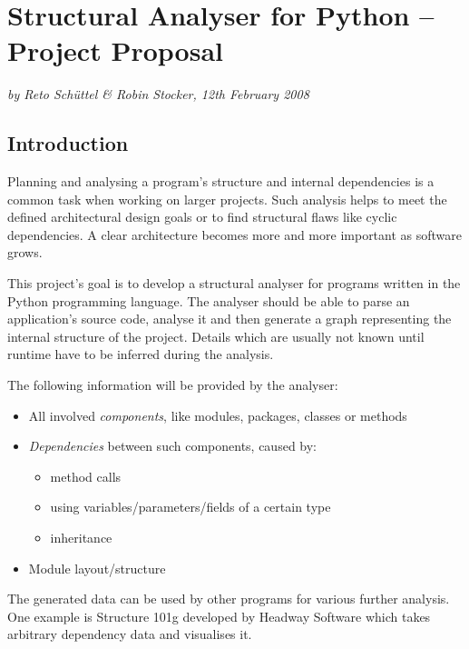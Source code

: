 \documentclass[12pt,halfparskip]{scrartcl}
\begin{document}
\pagestyle{plain}

\section*{Structural Analyser for Python – Project Proposal}
\vspace{-0.5cm}

\emph{by Reto Schüttel \& Robin Stocker, 12th February 2008}

\vspace{-0.3cm}

\subsection*{Introduction}

Planning and analysing a program's structure and internal dependencies is a common task when working on larger projects. Such analysis helps to meet the defined architectural design goals or to find structural flaws like cyclic dependencies. A clear architecture becomes more and more important as software grows.

This project's goal is to develop a structural analyser for programs written in the Python programming language. The analyser should be able to parse an application's source code, analyse it and then generate a graph representing the internal structure of the project. Details which are usually not known until runtime have to be inferred during the analysis.

The following information will be provided by the analyser: 
\begin{itemize}
	\item All involved \emph{components}, like modules, packages, classes or methods
	\item \emph{Dependencies} between such components, caused by:
	\begin{itemize}
		\item method calls
		\item using variables/parameters/fields of a certain type
		\item inheritance
	\end{itemize}
	\item Module layout/structure
\end{itemize}

The generated data can be used by other programs for various further analysis. One example is Structure 101g developed by Headway Software which takes arbitrary dependency data and visualises it. 
\end{document}
